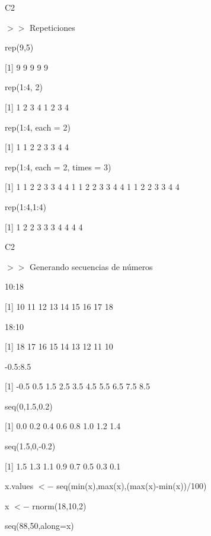 \documentclass{beamer}
\theoremstyle{definition}
\theoremstyle{remark}
\begin{document}
\begin{frame}{C2}


$>>$ Repeticiones

\hfill

rep(9,5)

[1] 9 9 9 9 9

\hfill

rep(1:4, 2)

[1] 1 2 3 4 1 2 3 4

\hfill

rep(1:4, each = 2)

[1] 1 1 2 2 3 3 4 4

\hfill

rep(1:4, each = 2, times = 3)

[1] 1 1 2 2 3 3 4 4 1 1 2 2 3 3 4 4 1 1 2 2 3 3 4 4

\hfill

rep(1:4,1:4)

[1] 1 2 2 3 3 3 4 4 4 4




\end{frame}


\begin{frame}{C2}

$>>$ Generando secuencias de n\'umeros

\hfill

10:18

[1] 10 11 12 13 14 15 16 17 18

\hfill

18:10

[1] 18 17 16 15 14 13 12 11 10

\hfill

-0.5:8.5

[1] -0.5 0.5 1.5 2.5 3.5 4.5 5.5 6.5 7.5 8.5

\hfill

seq(0,1.5,0.2)

[1] 0.0 0.2 0.4 0.6 0.8 1.0 1.2 1.4

\hfill

seq(1.5,0,-0.2)

[1] 1.5 1.3 1.1 0.9 0.7 0.5 0.3 0.1

\hfill




\end{frame}

x.values $<-$ seq(min(x),max(x),(max(x)-min(x))/100)

x $<-$ rnorm(18,10,2)

seq(88,50,along=x)
\end{document}
